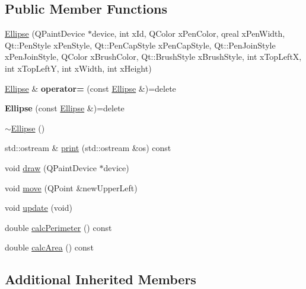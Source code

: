\subsection*{Public Member Functions}
\begin{DoxyCompactItemize}
\item 
\hyperlink{classEllipse_acec99b1c3bac3534d5c1c9ded420e29f}{Ellipse} (Q\-Paint\-Device $\ast$device, int x\-Id, Q\-Color x\-Pen\-Color, qreal x\-Pen\-Width, Qt\-::\-Pen\-Style x\-Pen\-Style, Qt\-::\-Pen\-Cap\-Style x\-Pen\-Cap\-Style, Qt\-::\-Pen\-Join\-Style x\-Pen\-Join\-Style, Q\-Color x\-Brush\-Color, Qt\-::\-Brush\-Style x\-Brush\-Style, int x\-Top\-Left\-X, int x\-Top\-Left\-Y, int x\-Width, int x\-Height)
\item 
\hypertarget{classEllipse_ad9a01ff7963a3bb34becaa0849510f5f}{\hyperlink{classEllipse}{Ellipse} \& {\bfseries operator=} (const \hyperlink{classEllipse}{Ellipse} \&)=delete}\label{classEllipse_ad9a01ff7963a3bb34becaa0849510f5f}

\item 
\hypertarget{classEllipse_ae9069aaff10df80436665806fa3fd441}{{\bfseries Ellipse} (const \hyperlink{classEllipse}{Ellipse} \&)=delete}\label{classEllipse_ae9069aaff10df80436665806fa3fd441}

\item 
\hyperlink{classEllipse_a94271a8a2b16101a52491b7e81e28547}{$\sim$\-Ellipse} ()
\item 
std\-::ostream \& \hyperlink{classEllipse_a6cd8da652c6e66f465fb23253deab458}{print} (std\-::ostream \&os) const 
\item 
void \hyperlink{classEllipse_a15ee15d60a77d8b0bb1711d96b5dd062}{draw} (Q\-Paint\-Device $\ast$device)
\item 
void \hyperlink{classEllipse_a29e9857d31cd33aa127c7ab171575c88}{move} (Q\-Point \&new\-Upper\-Left)
\item 
void \hyperlink{classEllipse_a49d149cb6210f1b2fb58b10fbd8bed18}{update} (void)
\item 
double \hyperlink{classEllipse_a70f7a8edec42201d11c6fae43714c4c2}{calc\-Perimeter} () const 
\item 
double \hyperlink{classEllipse_a955141666e258fc582889a5f9298d798}{calc\-Area} () const 
\end{DoxyCompactItemize}
\subsection*{Additional Inherited Members}


